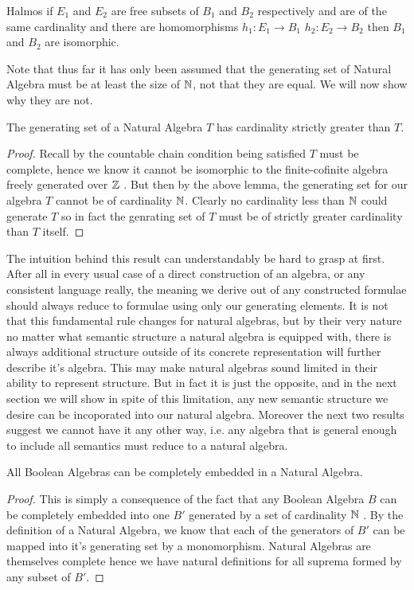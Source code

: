 \documentclass[12pt]{amsart}
\begin{document}
\begin{lem}Halmos\cite{Halmos2} if $E_1$ and $E_2$ are free subsets of $B_1$ and $B_2$ respectively and are of the same cardinality and there are homomorphisms $h_1:E_1\rightarrow B_1$ $h_2:E_2\rightarrow B_2$ then $B_1$ and $B_2$ are isomorphic.
\end{lem}
Note that thus far it has only been assumed that the generating set of Natural Algebra must be at least the size of $\mathbb{N}$, not that they are equal. We will now show why they are not.
\begin{thm}
The generating set of a Natural Algebra $T$ has cardinality strictly greater than $T$.
\end{thm}
\begin{proof}
 Recall by the countable chain condition being satisfied $T$ must be complete, hence we know it cannot be isomorphic to the finite-cofinite algebra freely generated over $\mathbb{Z}$ \cite{Halmos2}. But then by the above lemma, the generating set for our algebra $T$ cannot be of cardinality $\mathbb{N}$. Clearly no cardinality less than $\mathbb{N}$ could generate $T$ so in fact the genrating set of $T$ must be of strictly greater cardinality than $T$ itself.
\end{proof}
The intuition behind this result can understandably be hard to grasp at first. After all in every usual case of a direct construction of an algebra, or any consistent language really, the meaning we derive out of any constructed formulae should always reduce to formulae using only our generating elements. It is not that this fundamental rule changes for natural algebras, but by their very nature no matter what semantic structure a natural algebra is equipped with, there is always additional structure outside of its concrete representation will further describe it's algebra. This may make natural algebras sound limited in their ability to represent structure. But in fact it is just the opposite, and in the next section we will show in spite of this limitation, any new semantic structure we desire can be incoporated into our natural algebra. Moreover the next two results suggest we cannot have it any other way, i.e. any algebra that is general enough to include all semantics must reduce to a natural algebra.
\begin{thm}
All Boolean Algebras can be completely embedded in a Natural Algebra.
\end{thm}
\begin{proof}
	This is simply a consequence of the fact that any Boolean Algebra $B$ can be completely embedded into one $B'$ generated by a set of cardinality $\mathbb{N}$ \cite{Kripke}. By the definition of a Natural Algebra, we know that each of the generators of $B'$ can be mapped into it's generating set by a monomorphism. Natural Algebras are themselves complete hence we have natural definitions for all suprema formed by any subset of $B'$.
\end{proof}
\end{document}
